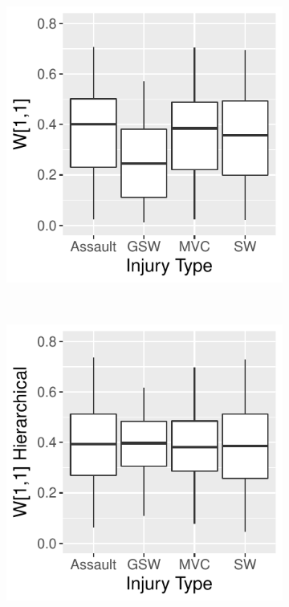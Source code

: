 \documentclass{article}
\begin{document}
\begin{figure}
    \centering
    \begin{subfigure}[b]{0.22\textwidth}
        \includegraphics[width=\textwidth]{shrinkageSep.pdf}
        \caption{}
        \label{fig:nonHierPosteriors}
    \end{subfigure}
    ~ %
    \begin{subfigure}[b]{0.22\textwidth}
        \includegraphics[width=\textwidth]{shrinkageHier.pdf}

\end{subfigure}
\end{figure}
\end{document}

